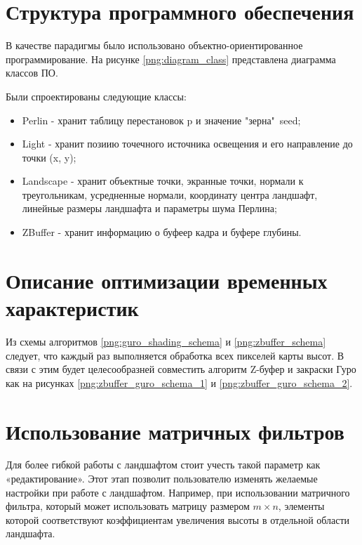 \section{Структура программного обеспечения}
В качестве парадигмы было использовано объектно-ориентированное программирование. На рисунке \ref{png:diagram_class} представлена диаграмма классов ПО.
\begin{figure}[H]
\end{figure}

Были спроектированы следующие классы:
\begin{itemize}
	\item Perlin - хранит таблицу перестановок p и значение "зерна"\ seed;
	\item Light - хранит позиию точечного источника освещения и его направление до точки (x, y);
	\item Landscape - хранит объектные точки, экранные точки, нормали к треугольникам, усредненные нормали, координату центра ландшафт, линейные размеры ландшафта и параметры шума Перлина;
	\item ZBuffer - хранит информацию о буфеер кадра и буфере глубины.
\end{itemize}

\section{Описание оптимизации временных характеристик}
Из схемы алгоритмов \ref{png:guro_shading_schema} и \ref{png:zbuffer_schema} следует, что каждый раз выполняется обработка всех пикселей карты высот. В связи с этим будет целесообразней совместить алгоритм Z-буфер и закраски Гуро как на рисунках \ref{png:zbuffer_guro_schema_1} и \ref{png:zbuffer_guro_schema_2}. 

\section{Использование матричных фильтров}
Для более гибкой работы с ландшафтом стоит учесть такой параметр как «редактирование». Этот этап позволит пользователю изменять желаемые настройки при работе с ландшафтом. Например, при использовании матричного фильтра, который может использовать матрицу размером $m\times n$, элементы которой соответствуют коэффициентам увеличения высоты в отдельной области ландшафта.

